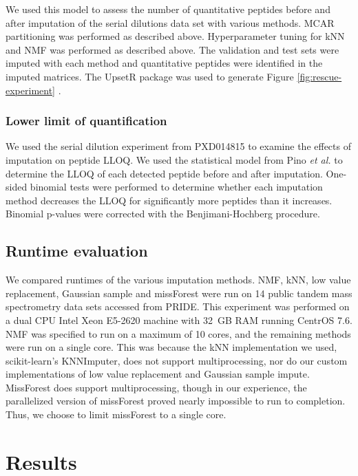\documentclass{article}
\begin{document}
We used this model to assess the number of quantitative peptides before and after imputation of the serial dilutions data set with various methods. MCAR partitioning was performed as described above. Hyperparameter tuning for kNN and NMF was performed as described above. The validation and test sets were imputed with each method and quantitative peptides were identified in the imputed matrices. The UpsetR package was used to generate Figure \ref{fig:rescue-experiment} \cite{UpsetR}.

\subsubsection{Lower limit of quantification}

We used the serial dilution experiment from PXD014815 to examine the effects of imputation on peptide LLOQ. We used the statistical model from Pino \textit{et al.} \cite{matrix-matched-calib} to determine the LLOQ of each detected peptide before and after imputation. One-sided binomial tests were performed to determine whether each imputation method decreases the LLOQ for significantly more peptides than it increases. Binomial p-values were corrected with the Benjimani-Hochberg procedure. 

\subsection{Runtime evaluation}

We compared runtimes of the various imputation methods. NMF, kNN, low value replacement, Gaussian sample and missForest were run on 14 public tandem mass spectrometry data sets accessed from PRIDE. This experiment was performed on a dual CPU Intel Xeon E5-2620 machine with 32~GB RAM running CentrOS 7.6. NMF was specified to run on a maximum of 10 cores, and the remaining methods were run on a single core. This was because the kNN implementation we used, scikit-learn's KNNImputer, does not support multiprocessing, nor do our custom implementations of low value replacement and Gaussian sample impute. MissForest does support multiprocessing, though in our experience, the parallelized version of missForest proved nearly impossible to run to completion. Thus, we choose to limit missForest to a single core. 

\section{Results}
\end{document}
